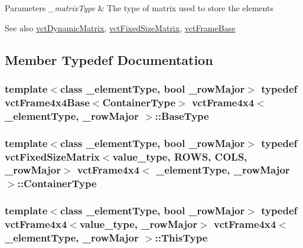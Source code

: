\begin{DoxyParams}{Parameters}
{\em \+\_\+matrix\+Type} & The type of matrix used to store the elements\\
\hline
\end{DoxyParams}
\begin{DoxySeeAlso}{See also}
\hyperlink{classvct_dynamic_matrix}{vct\+Dynamic\+Matrix}, \hyperlink{classvct_fixed_size_matrix}{vct\+Fixed\+Size\+Matrix}, \hyperlink{classvct_frame_base}{vct\+Frame\+Base} 
\end{DoxySeeAlso}


\subsection{Member Typedef Documentation}
\hypertarget{classvct_frame4x4_aea04715fa9c35ad348f07f24250674a9}{}
\subsubsection[{Base\+Type}]{\setlength{\rightskip}{0pt plus 5cm}template$<$class \+\_\+element\+Type, bool \+\_\+row\+Major$>$ typedef {\bf vct\+Frame4x4\+Base}$<${\bf Container\+Type}$>$ {\bf vct\+Frame4x4}$<$ \+\_\+element\+Type, \+\_\+row\+Major $>$\+::{\bf Base\+Type}}\label{classvct_frame4x4_aea04715fa9c35ad348f07f24250674a9}
\hypertarget{classvct_frame4x4_a3174a2ddafc9ae2b74009bab0c2b47c4}{}
\subsubsection[{Container\+Type}]{\setlength{\rightskip}{0pt plus 5cm}template$<$class \+\_\+element\+Type, bool \+\_\+row\+Major$>$ typedef {\bf vct\+Fixed\+Size\+Matrix}$<$value\+\_\+type, {\bf R\+O\+W\+S}, {\bf C\+O\+L\+S}, \+\_\+row\+Major$>$ {\bf vct\+Frame4x4}$<$ \+\_\+element\+Type, \+\_\+row\+Major $>$\+::{\bf Container\+Type}}\label{classvct_frame4x4_a3174a2ddafc9ae2b74009bab0c2b47c4}
\hypertarget{classvct_frame4x4_ad33a26b915cb65236c0744e2e9937d84}{}
\subsubsection[{This\+Type}]{\setlength{\rightskip}{0pt plus 5cm}template$<$class \+\_\+element\+Type, bool \+\_\+row\+Major$>$ typedef {\bf vct\+Frame4x4}$<$value\+\_\+type, \+\_\+row\+Major$>$ {\bf vct\+Frame4x4}$<$ \+\_\+element\+Type, \+\_\+row\+Major $>$\+::{\bf This\+Type}}\label{classvct_frame4x4_ad33a26b915cb65236c0744e2e9937d84}
\hypertarget{classvct_frame4x4_af8bf02c629bad73636da990ce9106fcf}{}
